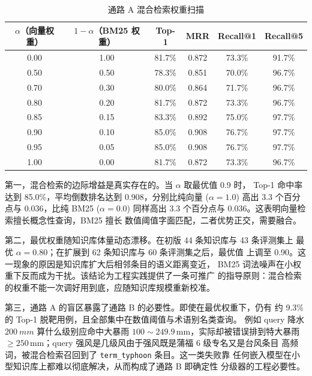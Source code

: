 \begin{table}[!ht]
    \centering
    \caption{通路 A 混合检索权重扫描}
    \label{tab:rag-weight-sweep}
    \song\wuhao
    \begin{tabular}{cccccc}
        \toprule
        $\alpha$（向量权重） & $1-\alpha$（BM25 权重） & Top-1 & MRR & Recall@1 & Recall@5 \\
        \midrule
        0.00 & 1.00 & 81.7\% & 0.872 & 73.3\% & 91.7\% \\
        0.50 & 0.50 & 78.3\% & 0.851 & 70.0\% & 96.7\% \\
        0.70 & 0.30 & 80.0\% & 0.864 & 71.7\% & 96.7\% \\
        0.80 & 0.20 & 81.7\% & 0.872 & 73.3\% & 96.7\% \\
        0.85 & 0.15 & 83.3\% & 0.892 & 75.0\% & 97.7\% \\
        0.90 & 0.10 & 85.0\% & 0.908 & 76.7\% & 97.7\% \\
        0.95 & 0.05 & 85.0\% & 0.908 & 76.7\% & 97.7\% \\
        1.00 & 0.00 & 81.7\% & 0.872 & 73.3\% & 96.7\% \\
        \bottomrule
    \end{tabular}
\end{table}

第一，混合检索的边际增益是真实存在的。当 $\alpha$ 取最优值 0.9 时，
Top-1 命中率达到 85.0\%，平均倒数排名达到 0.908，分别比纯向量
($\alpha = 1.0$) 高出 3.3 个百分点与 0.036，比纯 BM25 ($\alpha = 0.0$)
同样高出 3.3 个百分点与 0.036。这表明向量检索擅长概念性查询，BM25 擅长
数值阈值字面匹配，二者优势正交，需要融合。

第二，最优权重随知识库体量动态漂移。在初版 44 条知识库与 43 条评测集上
最优 $\alpha = 0.80$；在扩展到 62 条知识库与 60 条评测集之后，最优值
上调至 0.90。这一现象的原因是知识库扩大后相邻条目的语义距离变近，
BM25 词法噪声在小权重下反而成为干扰。该结论为工程实践提供了一条可推广
的指导原则：混合检索的权重不能一次调好用到底，应随知识库规模重新校准。

第三，通路 A 的盲区暴露了通路 B 的必要性。即使在最优权重下，仍有
约 9.3\% 的 Top-1 脱靶用例，且全部集中在数值阈值与术语别名类查询。
例如 query 降水 $\SI{200}{mm}$ 算什么级别应命中大暴雨
$100\sim249.9\,\mathrm{mm}$，实际却被错误排到特大暴雨 $\geq 250\,
\mathrm{mm}$；query 强风是几级风由于强风既是蒲福 6 级专名又是台风条目
高频词，被混合检索召回到了 \texttt{term\_\bk{}typhoon} 条目。这一类失败靠
任何嵌入模型在小型知识库上都难以彻底解决，从而构成了通路 B 即确定性
分级器的工程必要性。


